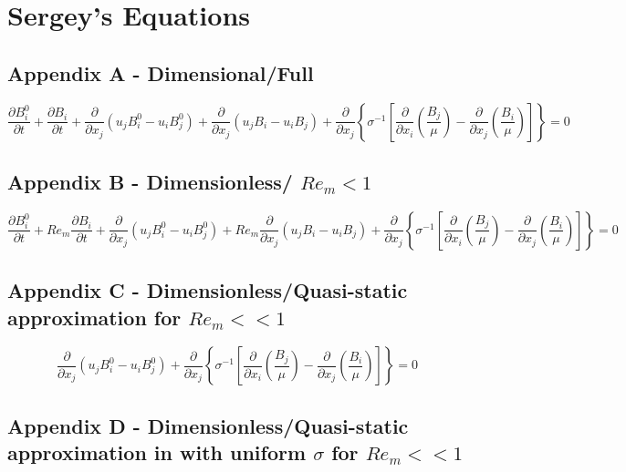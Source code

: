\documentclass[11pt]{article}
\newcommand{\PD}{\partial}
\newcommand{\SII}{\sigma^{-1}}
\begin{document}
\section{Sergey's Equations}

\subsection{Appendix A - Dimensional/Full}

\begin{equation*}
	\frac{\PD B_i^0}{\PD t}
	+
	\frac{\PD B_i}{\PD t} 
	+ 
	\frac{\PD}{\PD x_j} (u_j B_i^0 - u_i B_j^0) 
	+
	\frac{\PD}{\PD x_j} (u_j B_i - u_i B_j) 
	+ 
	\frac{\PD}{\PD x_j} 
	\left\{ \SII 
	\left[ 
	\frac{\PD}{\PD x_i} 
	\left( \frac{B_j}{\mu} \right) 
	- 
	\frac{\PD}{\PD x_j} 
	\left( \frac{B_i}{\mu} \right)
	\right]
	\right\}
	= 
	0
\end{equation*}


\subsection{Appendix B - Dimensionless/ \texorpdfstring{$Re_m<1$}{LG}}

\begin{equation*}
	\frac{\PD B_i^0}{\PD t}
	+
 	Re_m
	\frac{\PD B_i}{\PD t} 
	+ 
	\frac{\PD}{\PD x_j} (u_j B_i^0 - u_i B_j^0) 
	+
 	Re_m
	\frac{\PD}{\PD x_j} (u_j B_i - u_i B_j) 
	+ 
	\frac{\PD}{\PD x_j} 
	\left\{ \SII 
	\left[ 
	\frac{\PD}{\PD x_i} 
	\left( \frac{B_j}{\mu} \right) 
	- 
	\frac{\PD}{\PD x_j} 
	\left( \frac{B_i}{\mu} \right)
	\right]
	\right\}
	= 
	0
\end{equation*}


\subsection{Appendix C - Dimensionless/Quasi-static approximation for \texorpdfstring{$Re_m<<1$}{LG}}

\begin{equation*}
	\frac{\PD}{\PD x_j} (u_j B_i^0 - u_i B_j^0) 
	+ 
	\frac{\PD}{\PD x_j} 
	\left\{ \SII 
	\left[ 
	\frac{\PD}{\PD x_i} 
	\left( \frac{B_j}{\mu} \right) 
	- 
	\frac{\PD}{\PD x_j} 
	\left( \frac{B_i}{\mu} \right)
	\right]
	\right\}
	= 
	0
\end{equation*}

\subsection{Appendix D - Dimensionless/Quasi-static approximation in with uniform \texorpdfstring{$\sigma$}{LG} for \texorpdfstring{$Re_m<<1$}{LG}}
\end{document}
